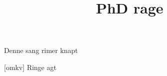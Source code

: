 \documentclass[a4paper,11pt]{article}
\title{PhD rage}
\begin{document}
\maketitle

\begin{song}
   Denne sang rimer knapt

  [omkv] Ringe agt

\end{song}
\end{document}

